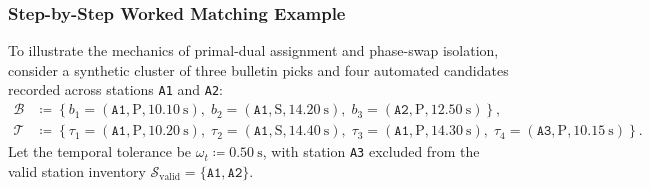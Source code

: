 \subsubsection*{Step-by-Step Worked Matching Example}
To illustrate the mechanics of primal-dual assignment and phase-swap isolation,
consider a synthetic cluster of three bulletin picks and four
automated candidates
recorded across stations \texttt{A1} and \texttt{A2}:
\begin{align*}
  \mathcal{B} &\coloneqq \left\{
    b_1 = (\texttt{A1}, \mathrm{P}, \qty{10.10}{\second}),\;
    b_2 = (\texttt{A1}, \mathrm{S}, \qty{14.20}{\second}),\;
    b_3 = (\texttt{A2}, \mathrm{P}, \qty{12.50}{\second})
  \right\}, \\
  \mathcal{T} &\coloneqq \left\{
    \tau_1 = (\texttt{A1}, \mathrm{P}, \qty{10.20}{\second}),\;
    \tau_2 = (\texttt{A1}, \mathrm{S}, \qty{14.40}{\second}),\;
    \tau_3 = (\texttt{A1}, \mathrm{P}, \qty{14.30}{\second}),\;
    \tau_4 = (\texttt{A3}, \mathrm{P}, \qty{10.15}{\second})
  \right\}.
\end{align*}
Let the temporal tolerance be $\omega_t \coloneqq
\qty{0.50}{\second}$, with station \texttt{A3}
excluded from the valid station inventory
$\mathcal{S}_{\text{valid}} = \{\texttt{A1}, \texttt{A2}\}$.

